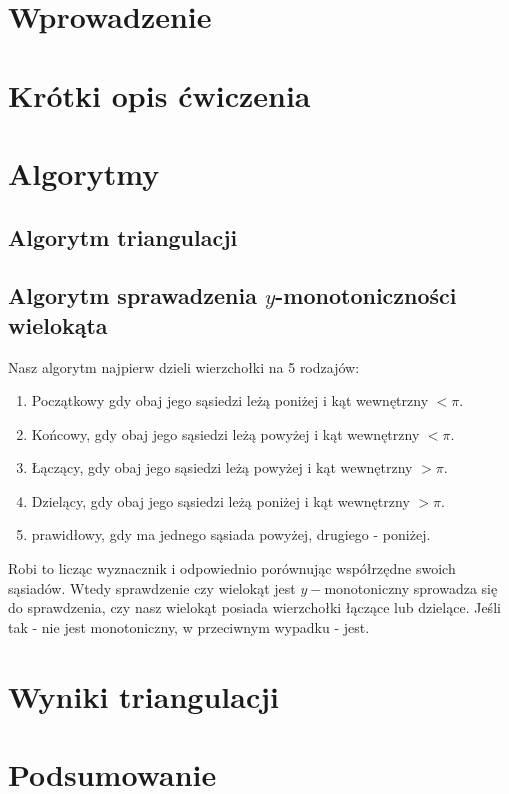 \documentclass{sprawozdanie-agh}
\begin{document}

\stronatytulowa{}

\section{Wprowadzenie}


\section{Krótki opis ćwiczenia}


\section{Algorytmy}
\subsection{Algorytm triangulacji}

\subsection{Algorytm sprawadzenia $y$-monotoniczności wielokąta}
\quad Nasz algorytm najpierw dzieli wierzchołki na 5 rodzajów: 
\begin{enumerate}
    \item Początkowy gdy obaj jego sąsiedzi leżą
    poniżej i kąt wewnętrzny $< \pi$.
    \item Końcowy, gdy obaj jego sąsiedzi leżą
    powyżej i kąt wewnętrzny $< \pi$.
    \item Łączący, gdy obaj jego sąsiedzi leżą
    powyżej i kąt wewnętrzny $> \pi$.
    \item Dzielący, gdy obaj jego sąsiedzi leżą
    poniżej i kąt wewnętrzny $> \pi$.
    \item prawidłowy, gdy ma jednego sąsiada powyżej, drugiego - poniżej.
\end{enumerate}

Robi to licząc wyznacznik i odpowiednio porównując współrzędne swoich sąsiadów. 
Wtedy sprawdzenie czy wielokąt jest $y-$monotoniczny sprowadza się do sprawdzenia, czy nasz 
wielokąt posiada wierzchołki łączące lub dzielące. Jeśli tak - nie jest monotoniczny, w przeciwnym wypadku - jest.

\section{Wyniki triangulacji}

\section{Podsumowanie}

\end{document}
